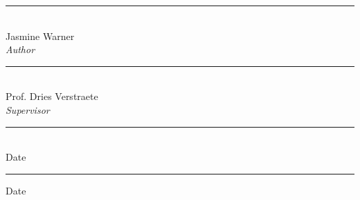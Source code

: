 \begin{declaration}
\vfill
\begin{center}
    \begin{minipage}[t]{0.4\textwidth}
        \begin{flushleft}
            \rule{\textwidth}{0.5pt}\\
            Jasmine Warner\\
            \emph{Author}
            \\[1.5cm]
            \rule{\textwidth}{0.5pt}\\
            Prof. Dries Verstraete\\
            \emph{Supervisor}
        \end{flushleft}
    \end{minipage}
    \hspace{1cm}
    \begin{minipage}[t]{0.4\textwidth}
        \begin{flushleft}
            \rule{\textwidth}{0.5pt}\\
            Date
            \\[2.15cm]
            \rule{\textwidth}{0.5pt}
            Date
        \end{flushleft}
    \end{minipage}
\end{center}


\end{declaration}
\restoregeometry
